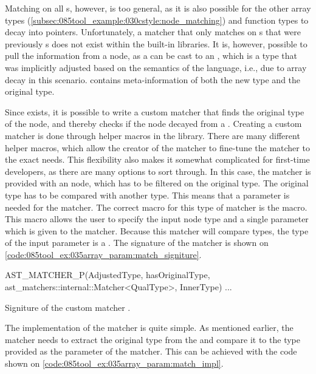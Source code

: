 Matching on all s, however, is too general, as it is also possible for the other array types (\cref{subsec:085tool_example:030cstyle:node_matching}) and function types to decay into pointers.
Unfortunately, a matcher that only matches on s that were previously s does not exist within the built-in libraries. It is, however, possible to pull the information from a node, as a  can be cast to an , which is a type that was implicitly adjusted based on the semantics of the language, i.e., due to array decay in this scenario.  contains meta-information of both the new type and the original type.

Since  exists, it is possible to write a custom matcher that finds the original type of the node, and thereby checks if the node decayed from a .
Creating a custom matcher is done through helper macros in the library. There are many different helper macros, which allow the creator of the matcher to fine-tune the matcher to the exact needs. This flexibility also makes it somewhat complicated for first-time developers, as there are many options to sort through. In this case, the matcher is provided with an  node, which has to be filtered on the original type. The original type has to be compared with another type. This means that a parameter is needed for the matcher. The correct macro for this type of matcher is the  macro. This macro allows the user to specify the input node type and a single parameter which is given to the matcher. Because this matcher will compare types, the type of the input parameter is a . The signature of the matcher is shown on \cref{code:085tool_ex:035array_param:match_signiture}.

\begin{listing}[H]
    \begin{cppcode}
AST_MATCHER_P(AdjustedType, hasOriginalType, ast_matchers::internal::Matcher<QualType>, InnerType) {
    ...
}
    \end{cppcode}
    \caption{Signiture of the custom matcher .}
    \label{code:085tool_ex:035array_param:match_signiture}
\end{listing}

The implementation of the matcher is quite simple. As mentioned earlier, the matcher needs to extract the original type from the  and compare it to the type provided as the parameter of the matcher. This can be achieved with the code shown on \cref{code:085tool_ex:035array_param:match_impl}.

